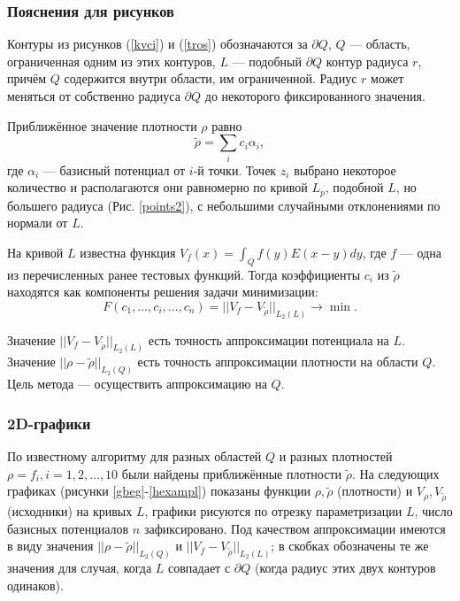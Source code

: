 \documentclass[a4paper]{article}
\newcommand{\V}[1]{\int_Q #1(y) E(x-y) dy}
\begin{document}
\subsubsection{Пояснения для рисунков}
Контуры из рисунков (\ref{kvci}) и (\ref{tros}) обозначаются за $\partial Q$, $Q$ --- область, ограниченная одним из этих контуров,
$L$ --- подобный $\partial Q$ контур радиуса $r$, причём $Q$ содержится внутри области, им ограниченной. Радиус $r$ может меняться от собственно радиуса $\partial Q$ до некоторого фиксированного значения.

Приближённое значение плотности $\rho$ равно
\begin{equation*}
  \tilde{\rho} = \sum_i c_i \alpha_i,
\end{equation*}
где $\alpha_i$ --- базисный потенциал от $i$-й точки.
Точек $z_i$ выбрано некоторое количество и располагаются они равномерно по кривой $L_p$, подобной $L$, но большего радиуса (Рис. \ref{points2}), с небольшими случайными отклонениями по нормали от $L$.

На кривой $L$ известна функция $V_f(x)=\V{f}$, где $f$ --- одна из перечисленных ранее тестовых функций.
Тогда коэффициенты $c_i$ из $\tilde{\rho}$ находятся как компоненты решения задачи минимизации:
\begin{equation*}
  F(c_1,\dots,c_i,\dots,c_n)=||V_f-V_{\tilde{\rho} } ||_{L_2(L)}\rightarrow \min.
\end{equation*}

Значение $||V_f-V_{\tilde{\rho} } ||_{L_2(L)}$ есть точность аппроксимации потенциала на $L$.
Значение $||\rho-\tilde{\rho} ||_{L_2(Q)}$ есть точность аппроксимации плотности на области $Q$.
Цель метода --- осуществить аппроксимацию на $Q$.

\subsubsection{2D-графики}
По известному алгоритму для разных областей $Q$ и разных плотностей $\rho=f_i,i=1,2,\dots,10$ были найдены приближённые плотности $\tilde{\rho}$.
На следующих графиках (рисунки \ref{gbeg}-\ref{hexampl}) показаны функции $\rho, \tilde{\rho}$ (плотности) и $V_{\rho},V_{\tilde{\rho}}$ (исходники) на кривых $L$, графики рисуются по отрезку параметризации $L$, число базисных потенциалов $n$ зафиксировано.
Под качеством аппроксимации имеются в виду значения $||\rho-\tilde{\rho} ||_{L_2(Q)}$ и $||V_f-V_{\tilde{\rho} } ||_{L_2(L)}$; в скобках обозначены те же значения для случая, когда $L$ совпадает с $\partial Q$ (когда радиус этих двух контуров одинаков).
\end{document}
